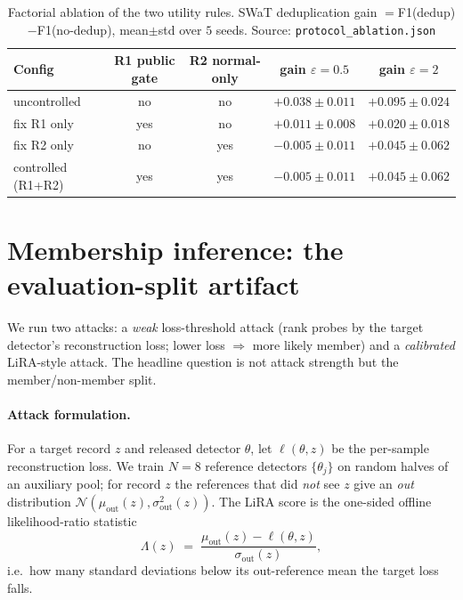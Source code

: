 \documentclass{article}
\providecommand{\botrule}{\bottomrule}%
\providecommand{\yes}{yes}\providecommand{\no}{no}%
\begin{document}
\begin{table}[h]\centering
\caption{Factorial ablation of the two utility rules. SWaT deduplication gain
$=$F1(dedup)$-$F1(no-dedup), mean$\pm$std over $5$ seeds. Source:
\texttt{protocol\_ablation.json}}\label{tab:ablation}
\begin{tabular}{@{}lcccc@{}}
\toprule
Config & R1 public gate & R2 normal-only & gain $\varepsilon{=}0.5$ & gain $\varepsilon{=}2$ \\
\midrule
uncontrolled     & \no & \no & $+0.038\pm0.011$ & $+0.095\pm0.024$ \\
fix R1 only      & \yes & \no & $+0.011\pm0.008$ & $+0.020\pm0.018$ \\
fix R2 only      & \no & \yes & $-0.005\pm0.011$ & $+0.045\pm0.062$ \\
controlled (R1+R2) & \yes & \yes & $-0.005\pm0.011$ & $+0.045\pm0.062$ \\
\botrule
\end{tabular}
\end{table}

\section{Membership inference: the evaluation-split artifact}\label{supp:mia}
We run two attacks: a \emph{weak} loss-threshold attack (rank probes by the target
detector's reconstruction loss; lower loss $\Rightarrow$ more likely member) and a
\emph{calibrated} LiRA-style attack. The headline question is not attack strength but the
member/non-member split.

\paragraph{Attack formulation.} For a target record $z$ and released detector $\theta$, let
$\ell(\theta,z)$ be the per-sample reconstruction loss. We train $N{=}8$ reference detectors
$\{\theta_j\}$ on random halves of an auxiliary pool; for record $z$ the references that did
\emph{not} see $z$ give an \emph{out} distribution
$\mathcal{N}(\mu_{\text{out}}(z),\sigma_{\text{out}}^2(z))$. The LiRA score is the one-sided
offline likelihood-ratio statistic
\[
\Lambda(z) \;=\; \frac{\mu_{\text{out}}(z)-\ell(\theta,z)}{\sigma_{\text{out}}(z)},
\]
i.e.\ how many standard deviations below its out-reference mean the target loss falls.
\end{document}
